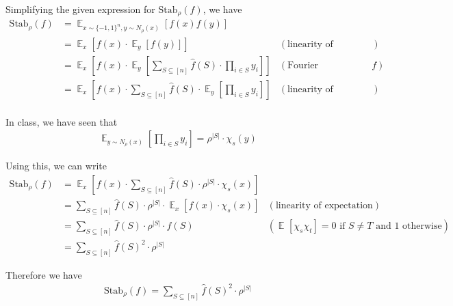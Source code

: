 \documentclass{article}
\newcommand{\E}[2]{\mathop{\mathbb{E}}_{#1}\left[#2\right]}
\begin{document}
Simplifying the given expression for $\text{Stab}_\rho(f)$, we have
\begin{align*}
	\text{Stab}_\rho(f) &= \E{x \sim {\{-1, 1\}}^n, y \sim N_\rho(x)}{f(x)f(y)} \\
	&= \E{x}{f(x) \cdot \E{y}{f(y)}} & (\text{linearity of expectation}) \\
	&= \E{x}{f(x) \cdot \E{y}{\sum_{S \subseteq [n]} \hat{f}(S) \cdot \prod_{i \in S}y_i}} & (\text{Fourier representation of } f) \\
	&= \E{x}{f(x) \cdot \sum_{S \subseteq [n]} \hat{f}(S) \cdot \E{y}{\prod_{i \in S}y_i}} & (\text{linearity of expectation}) \\
\end{align*}

\noindent
In class, we have seen that 
\begin{align*}
	\E{y \sim N_\rho(x)}{\prod_{i \in S}y_i} = \rho^{|S|} \cdot \chi_s(y)
\end{align*}

\noindent
Using this, we can write
\begin{align*}
	\text{Stab}_\rho(f) &= \E{x}{f(x) \cdot \sum_{S \subseteq [n]} \hat{f}(S) \cdot \rho^{|S|} \cdot \chi_s(x)} \\
	&= \sum_{S \subseteq [n]} \hat{f}(S) \cdot \rho^{|S|} \cdot \E{x}{f(x) \cdot \chi_s(x)} & (\text{linearity of expectation}) \\
	&= \sum_{S \subseteq [n]} \hat{f}(S) \cdot \rho^{|S|} \cdot \hat{f}(S) & (\E{}{\chi_s\chi_t} = 0 \text{ if } S \neq T \text{ and } 1 \text{ otherwise}) \\
	&= \sum_{S \subseteq [n]} \hat{f}(S)^2 \cdot \rho^{|S|}
\end{align*}

\noindent
Therefore we have
\begin{align*}
	\boxed{\text{Stab}_\rho(f) = \sum_{S \subseteq [n]} \hat{f}(S)^2 \cdot \rho^{|S|}}
\end{align*}
\vspace*{-12mm}\begin{flushright}\qedsymbol\end{flushright}

\,
\subsection{} \vspace*{-8mm}
\end{document}
